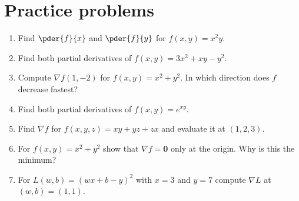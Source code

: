 \section*{Practice problems}
\begin{enumerate}[label=\textbf{\thechapter.\arabic*}]
  \item Find $\pder{f}{x}$ and $\pder{f}{y}$ for $f(x,y)=x^2y$.
  \item Find both partial derivatives of $f(x,y)=3x^2+xy-y^2$.
  \item Compute $\nabla f(1,-2)$ for $f(x,y)=x^2+y^2$. In which direction does $f$ decrease fastest?
  \item Find both partial derivatives of $f(x,y)=e^{xy}$.
  \item Find $\nabla f$ for $f(x,y,z)=xy+yz+zx$ and evaluate it at $(1,2,3)$.
  \item For $f(x,y)=x^2+y^2$ show that $\nabla f=\mathbf 0$ only at the origin. Why is this the minimum?
  \item[\textbf{\thechapter.7}$\star$] For $L(w,b)=(wx+b-y)^2$ with $x=3$ and $y=7$ compute $\nabla L$ at $(w,b)=(1,1)$.
\end{enumerate}

